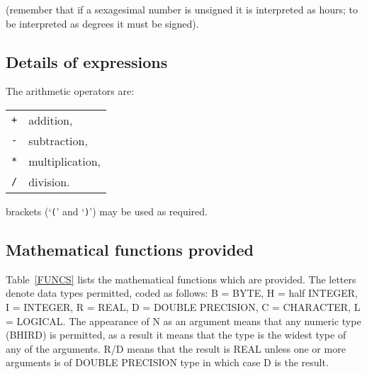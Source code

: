 \documentclass[twoside,11pt]{starlink}
\begin{document}
(remember that if a sexagesimal number is unsigned it is interpreted as
hours; to be interpreted as degrees it must be signed).

\subsection{Details of expressions}

The arithmetic operators are:

\begin{tabular}{ll}
\texttt{+}  & addition,        \\
\texttt{-}  & subtraction,     \\
\texttt{*}  & multiplication,  \\
\texttt{/}  & division.        \\
\end{tabular}

brackets (`\texttt{(}' and `\texttt{)}') may be used as required.


\subsection{Mathematical functions provided}

Table~\ref{FUNCS} lists the mathematical functions which are provided.
The letters denote data types permitted, coded as follows: B = BYTE,
H = half INTEGER, I = INTEGER, R = REAL, D = DOUBLE PRECISION, C =
CHARACTER, L = LOGICAL. The appearance of N as an argument means that
any numeric type (BHIRD) is permitted, as a result it means that the
type is the widest type of any of the arguments.  R/D means that the
result is REAL unless one or more arguments is of DOUBLE PRECISION
type in which case D is the result.
\end{document}
